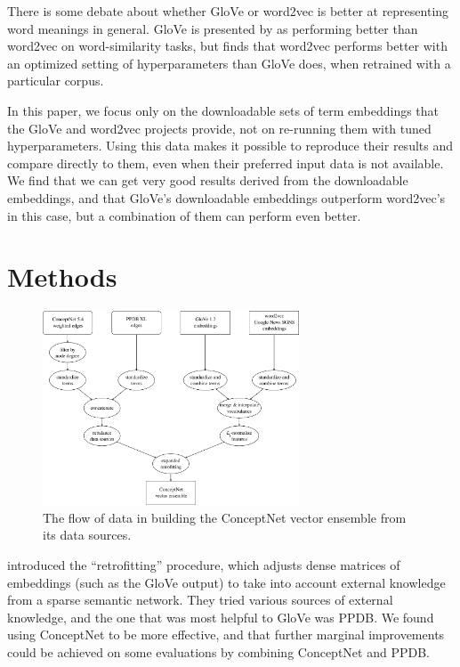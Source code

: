 \documentclass[11pt,letterpaper]{article}
\begin{document}
There is some debate about whether GloVe or word2vec is better at representing
word meanings in general. GloVe is presented by 
as performing better than word2vec on word-similarity tasks, but
 finds that word2vec performs better with an
optimized setting of hyperparameters than GloVe does, when retrained with a
particular corpus.

In this paper, we focus only on the downloadable sets of term embeddings that
the GloVe and word2vec projects provide, not on re-running them with tuned
hyperparameters. Using this data makes it possible to reproduce their results
and compare directly to them, even when their preferred input data is not
available. We find that we can get very good results derived from
the downloadable embeddings, and that GloVe's downloadable embeddings outperform
word2vec's in this case, but a combination of them can perform even better.

\section{Methods}

\begin{figure}
\centering
\includegraphics[width=3.0in]{dataflow.pdf}
\caption{
    The flow of data in building the ConceptNet vector ensemble from its
    data sources.
}
\label{dataflow}
\end{figure}

 introduced the ``retrofitting'' procedure,
which adjusts dense matrices of embeddings (such as the GloVe output) to take
into account external knowledge from a sparse semantic network. They tried
various sources of external knowledge, and the one that was most helpful to
GloVe was PPDB.  We found using ConceptNet to be more effective, and that
further marginal improvements could be achieved on some evaluations by
combining ConceptNet and PPDB.
\end{document}
